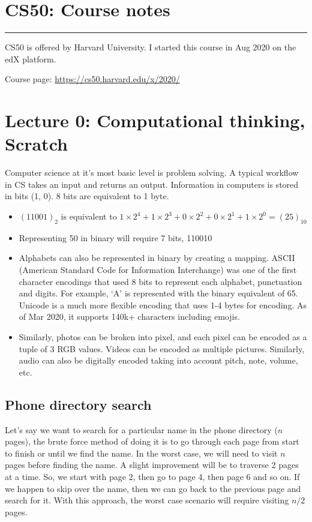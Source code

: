 \documentclass[11pt]{article}
\begin{document}
\thispagestyle{empty}
\setlength\parindent{0pt}

\section*{CS50: Course notes}
\hrule
\vspace{0.25in}
CS50 is offered by Harvard University. I started this course in Aug 2020 on the edX platform. 

\noindent 
Course page: \href{https://cs50.harvard.edu/x/2020/}{https://cs50.harvard.edu/x/2020/}

\section*{Lecture 0: Computational thinking, Scratch}
Computer science at it's most basic level is problem solving. A typical workflow in CS takes an input and returns an output. Information in computers is stored in bits (1, 0). 8 bits are equivalent to 1 byte. 

\begin{itemize}
	\item $(11001)_2$ is equivalent to $1\times2^4 + 1\times 2^3 + 0\times2^2 + 0\times2^1 + 1\times 2^0 = (25)_{10}$
	\item Representing 50 in binary will require 7 bits, 110010
	\item Alphabets can also be represented in binary by creating a mapping. ASCII (American Standard Code for Information Interchange) was one of the first character encodings that used 8 bits to represent each alphabet, punctuation and digits. For example, `A' is represented with the binary equivalent of 65. Unicode is a much more flexible encoding that uses 1-4 bytes for encoding. As of Mar 2020, it supports 140k+ characters including emojis.
	\item Similarly, photos can be broken into pixel, and each pixel can be encoded as a tuple of 3 RGB values. Videos can be encoded as multiple pictures. Similarly, audio can also be digitally encoded taking into account pitch, note, volume, etc.
\end{itemize}

\subsection*{Phone directory search}
Let's say we want to search for a  particular name in the phone directory ($n$ pages), the brute force method of doing it is to go through each page from start to finish or until we find the name. In the worst case, we will need to visit $n$ pages before finding the name. A slight improvement will be to traverse 2 pages at a time. So, we start with page 2, then go to page 4, then page 6 and so on. If we happen to skip over the name, then we can go back to the previous page and search for it. With this approach, the worst case scenario will require visiting $n/2$ pages. 
\end{document}
